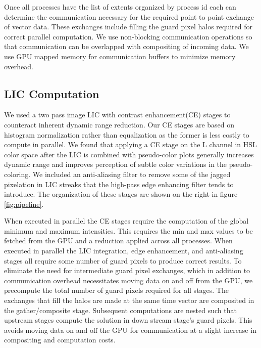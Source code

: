 \documentclass[a4paper,10pt]{article}
\begin{document}
Once all processes have the list of extents organized by process id each can determine the communication necessary for the required point to point exchange of vector data. These exchanges include filling the guard pixel halos required for correct parallel computation. We use non-blocking communication operations so that communication can be overlapped with compositing of incoming data. We use GPU mapped memory for communication buffers to minimize memory overhead.

\subsection{LIC Computation}
We used a two pass image LIC\citep{elic} with contrast enhancement(CE) stages to counteract inherent dynamic range reduction. Our CE stages are based on histogram normalization rather than equalization as the former is less costly to compute in parallel. We found that applying a CE stage on the L channel in HSL color space after the LIC is combined with pseudo-color plots generally increases dynamic range and improves perception of subtle color variations in the pseudo-coloring. We included an anti-aliasing filter to remove some of the jagged pixelation in LIC streaks that the high-pass edge enhancing filter tends to introduce. The organization of these stages are shown on the right in figure \ref{fig:pipeline}.

When executed in parallel the CE stages require the computation of the global minimum and maximum intensities. This requires the min and max values to be fetched from the GPU and a reduction applied across all processes. When executed in parallel the LIC integration, edge enhancement, and anti-aliasing stages all require some number of guard pixels to produce correct results. To eliminate the need for intermediate guard pixel exchanges, which in addition to communication overhead necessitates moving data on and off from the GPU, we precompute the total number of guard pixels required for all stages. The exchanges that fill the halos are made at the same time vector are composited in the gather/composite stage. Subsequent computations are nested such that upstream stages compute the solution in down stream stage's guard pixels. This avoids moving data on and off the GPU for communication at a slight increase in compositing and computation costs.
\end{document}
